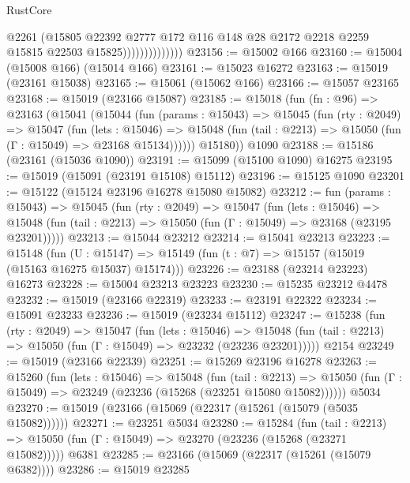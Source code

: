 \begin{lexlean}{RustCore}
\begin{coremodule}
                              @2261
                              (@15805
                                @22392
                                @2777
                                @172
                                @116
                                @148
                                @28
                                @2172
                                @2218
                                @2259
                                @15815
                                @22503
                                @15825))))))))))))))
@23156 := @15002 @166
@23160 := @15004 (@15008 @166) (@15014 @166)
@23161 := @15023 @16272
@23163 := @15019 (@23161 @15038)
@23165 := @15061 (@15062 @166)
@23166 := @15057 @23165
@23168 := @15019 (@23166 @15087)
@23185 := @15018
    (fun (fn : @96) =>
    @23163
      (@15041
        (@15044
          (fun (params : @15043) =>
          @15045
            (fun (rty : @2049) =>
            @15047
              (fun (lets : @15046) =>
              @15048 (fun (tail : @2213) => @15050 (fun (Γ : @15049) => @23168 @15134))))))
        @15180))
    @1090
@23188 := @15186 (@23161 (@15036 @1090))
@23191 := @15099 (@15100 @1090) @16275
@23195 := @15019 (@15091 (@23191 @15108) @15112)
@23196 := @15125 @1090
@23201 := @15122 (@15124 @23196 @16278 @15080 @15082)
@23212 := fun (params : @15043) =>
  @15045
    (fun (rty : @2049) =>
    @15047
      (fun (lets : @15046) =>
      @15048 (fun (tail : @2213) => @15050 (fun (Γ : @15049) => @23168 (@23195 @23201)))))
@23213 := @15044 @23212
@23214 := @15041 @23213
@23223 := @15148
    (fun (U : @15147) => @15149 (fun (t : @7) => @15157 (@15019 (@15163 @16275 @15037) @15174)))
@23226 := @23188 (@23214 @23223) @16273
@23228 := @15004 @23213 @23223
@23230 := @15235 @23212 @4478
@23232 := @15019 (@23166 @22319)
@23233 := @23191 @22322
@23234 := @15091 @23233
@23236 := @15019 (@23234 @15112)
@23247 := @15238
    (fun (rty : @2049) =>
    @15047
      (fun (lets : @15046) =>
      @15048 (fun (tail : @2213) => @15050 (fun (Γ : @15049) => @23232 (@23236 @23201)))))
    @2154
@23249 := @15019 (@23166 @22339)
@23251 := @15269 @23196 @16278
@23263 := @15260
    (fun (lets : @15046) =>
    @15048
      (fun (tail : @2213) =>
      @15050 (fun (Γ : @15049) => @23249 (@23236 (@15268 (@23251 @15080 @15082))))))
    @5034
@23270 := @15019 (@23166 (@15069 (@22317 (@15261 (@15079 (@5035 @15082))))))
@23271 := @23251 @5034
@23280 := @15284
    (fun (tail : @2213) => @15050 (fun (Γ : @15049) => @23270 (@23236 (@15268 (@23271 @15082)))))
    @6381
@23285 := @23166 (@15069 (@22317 (@15261 (@15079 @6382))))
@23286 := @15019 @23285

\end{coremodule}
\end{lexlean}
